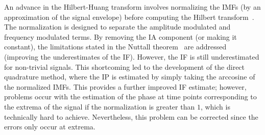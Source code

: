 \documentclass[a4paper]{IEEEtran}
\begin{document}
An advance in the Hilbert-Huang transform involves normalizing the IMFs (by an approximation of the signal envelope) before computing the Hilbert transform~\cite{Huang2005}. The normalization is designed to separate the amplitude modulated and frequency modulated terms. By removing the IA component (or making it constant), the limitations stated in the Nuttall theorem~\cite{Nuttall1966} are addressed (improving the underestimates of the IF). However, the IF is still underestimated for non-trivial signals. This shortcoming led to the development of the direct quadrature method, where the IP is estimated by simply taking the arccosine of the normalized IMFs. This provides a further improved IF estimate; however, problems occur with the estimation of the phase at time points corresponding to the extrema of the signal if the normalization is greater than $1$, which is technically hard to achieve. Nevertheless, this problem can be corrected since the errors only occur at extrema.
\end{document}
